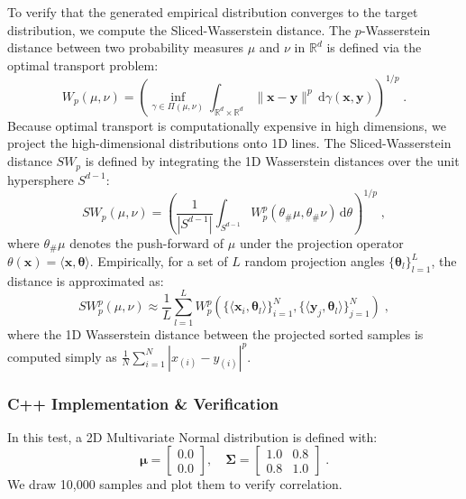 \documentclass{ol-softwaremanual}
\begin{document}
To verify that the generated empirical distribution converges to the target distribution, we compute the Sliced-Wasserstein distance. The $p$-Wasserstein distance between two probability measures $\mu$ and $\nu$ in $\mathbb{R}^d$ is defined via the optimal transport problem:
\begin{equation}
    W_p(\mu, \nu) = \left( \inf_{\gamma \in \Pi(\mu, \nu)} \int_{\mathbb{R}^d \times \mathbb{R}^d} \|\mathbf{x} - \mathbf{y}\|^p \, \mathrm{d}\gamma(\mathbf{x}, \mathbf{y}) \right)^{1/p} \;.
\end{equation}
Because optimal transport is computationally expensive in high dimensions, we project the high-dimensional distributions onto 1D lines. The Sliced-Wasserstein distance $SW_p$ is defined by integrating the 1D Wasserstein distances over the unit hypersphere $S^{d-1}$:
\begin{equation}
    SW_p(\mu, \nu) = \left( \frac{1}{|S^{d-1}|} \int_{S^{d-1}} W_p^p(\theta_\# \mu, \theta_\# \nu) \, \mathrm{d}\theta \right)^{1/p} \;,
\end{equation}
where $\theta_\# \mu$ denotes the push-forward of $\mu$ under the projection operator $\theta(\mathbf{x}) = \langle \mathbf{x}, \boldsymbol{\theta} \rangle$. Empirically, for a set of $L$ random projection angles $\{\boldsymbol{\theta}_l\}_{l=1}^L$, the distance is approximated as:
\begin{equation}
    SW_p^p(\mu, \nu) \approx \frac{1}{L} \sum_{l=1}^L W_p^p\left( \{\langle \mathbf{x}_i, \boldsymbol{\theta}_l \rangle\}_{i=1}^N, \{\langle \mathbf{y}_j, \boldsymbol{\theta}_l \rangle\}_{j=1}^N \right) \;,
\end{equation}
where the 1D Wasserstein distance between the projected sorted samples is computed simply as $\frac{1}{N} \sum_{i=1}^N |x_{(i)} - y_{(i)}|^p$.

\subsubsection{C++ Implementation \& Verification}
In this test, a 2D Multivariate Normal distribution is defined with:
\begin{equation}
    \boldsymbol{\mu} = \begin{bmatrix} 0.0 \\ 0.0 \end{bmatrix}, \quad \boldsymbol{\Sigma} = \begin{bmatrix} 1.0 & 0.8 \\ 0.8 & 1.0 \end{bmatrix} \;.
\end{equation}
We draw 10,000 samples and plot them to verify correlation.
\end{document}

